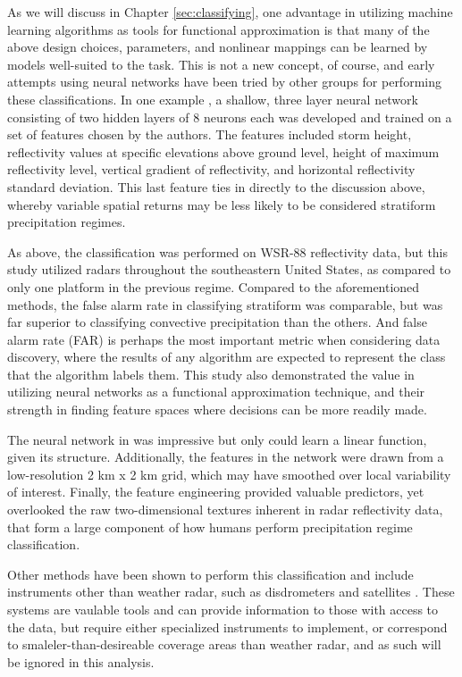 As we will discuss in Chapter \ref{sec:classifying}, one advantage in utilizing machine learning algorithms as tools for functional approximation is that many of the above design choices, parameters, and nonlinear mappings can be learned by models well-suited to the task.
This is not a new concept, of course, and early attempts using neural networks have been tried by other groups for performing these classifications. 
In one example \cite{anagnostou2004convective}, a shallow, three layer neural network consisting of two hidden layers of 8 neurons each was developed and trained on a set of features chosen by the authors.
The features included storm height, reflectivity values at specific elevations above ground level, height of maximum reflectivity level, vertical gradient of reflectivity, and horizontal reflectivity standard deviation.
This last feature ties in directly to the discussion above, whereby variable spatial returns may be less likely to be considered stratiform precipitation regimes.

As above, the classification was performed on WSR-88 reflectivity data, but this study utilized radars throughout the southeastern United States, as compared to only one platform in the previous regime.
Compared to the aforementioned methods, the false alarm rate in classifying stratiform was comparable, but was far superior to classifying convective precipitation than the others.
And false alarm rate (FAR) is perhaps the most important metric when considering data discovery, where the results of any algorithm are expected to represent the class that the algorithm labels them.
This study also demonstrated the value in utilizing neural networks as a functional approximation technique, and their strength in finding feature spaces where decisions can be more readily made.

The neural network in \cite{anagnostou2004convective} was impressive but only could learn a linear function, given its structure.
Additionally, the features in the network were drawn from a low-resolution 2 km x 2 km grid, which may have smoothed over local variability of interest.
Finally, the feature engineering provided valuable predictors, yet overlooked the raw two-dimensional textures inherent in radar reflectivity data, that form a large component of how humans perform precipitation regime classification.

Other methods have been shown to perform this classification and include instruments other than weather radar, such as disdrometers \cite{caracciolo2006analysis} and satellites \cite{feidas2012classifying}.
These systems are vaulable tools and can provide information to those with access to the data, but require either specialized instruments to implement, or correspond to smaleler-than-desireable coverage areas than weather radar, and as such will be ignored in this analysis.
